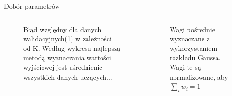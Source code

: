 \documentclass{beamer}
\begin{document}
\begin{frame}{Dobór parametrów}
\begin{columns}
	\begin{figure}
		\centering
		\caption{Błąd względny dla danych walidacyjnych(1) w zależności od K. Według wykresu najlepszą metodą wyznaczania wartości wyjściowej jest uśrednienie wszystkich danych uczących...}
	\end{figure}
	
	\begin{figure}
		\centering
		\caption{Wagi pośrednie wyznaczane z wykorzystaniem rozkładu Gaussa. Wagi te są normalizowane, aby $\sum_{i}w_i = 1$}
	\end{figure}
\end{columns}
\end{frame}
\end{document}
